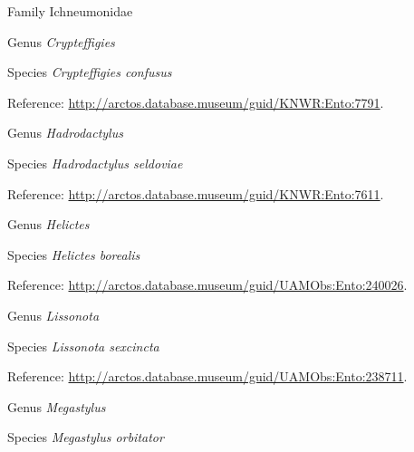 \documentclass[9pt, article]{memoir}
\begin{document}
\begin{multicols}{2}
\vspace{6pt}\noindent\hspace{24pt}Family Ichneumonidae


\vspace{6pt}\noindent\hspace{30pt}Genus \textit{Crypteffigies}


\vspace{6pt}\noindent\hspace{36pt}Species \textit{Crypteffigies confusus}


\vspace{6pt}Reference: 
\url{http://arctos.database.museum/guid/KNWR:Ento:7791}.

\vspace{6pt}\noindent\hspace{30pt}Genus \textit{Hadrodactylus}


\vspace{6pt}\noindent\hspace{36pt}Species \textit{Hadrodactylus seldoviae}


\vspace{6pt}Reference: 
\url{http://arctos.database.museum/guid/KNWR:Ento:7611}.

\vspace{6pt}\noindent\hspace{30pt}Genus \textit{Helictes}


\vspace{6pt}\noindent\hspace{36pt}Species \textit{Helictes borealis}


\vspace{6pt}Reference: 
\url{http://arctos.database.museum/guid/UAMObs:Ento:240026}.

\vspace{6pt}\noindent\hspace{30pt}Genus \textit{Lissonota}


\vspace{6pt}\noindent\hspace{36pt}Species \textit{Lissonota sexcincta}


\vspace{6pt}Reference: 
\url{http://arctos.database.museum/guid/UAMObs:Ento:238711}.

\vspace{6pt}\noindent\hspace{30pt}Genus \textit{Megastylus}


\vspace{6pt}\noindent\hspace{36pt}Species \textit{Megastylus orbitator}



\end{multicols}
\end{document}
